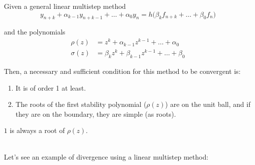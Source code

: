 \begin{theorem}
  Given a general linear multistep method $$y_{n+k} + \alpha_{k-1}y_{n+k-1} + \ldots + \alpha_0y_n = h\big(\beta_kf_{n+k}+\ldots+\beta_0f_n \big)$$ 
  
  and the polynomials
  \begin{align*}
      \rho(z)   &= z^k + \alpha_{k-1}z^{k-1} + \ldots + \alpha_0\\
      \sigma(z) &= \beta_kz^k + \beta_{k-1}z^{k-1} + \ldots + \beta_0
  \end{align*}
  
  Then, a necessary and sufficient condition for this method to be convergent is:
  \begin{enumerate}
      \item It is of order 1 at least.
      \item The roots of the first stability polynomial ($\rho(z)$) are on the unit ball, and if they are on the boundary, they are simple (as roots).
  \end{enumerate}
\end{theorem}

\begin{remark}
  $1$ is always a root of $\rho(z)$.
\end{remark}
\-\\
Let's see an example of divergence using a linear multistep method:

